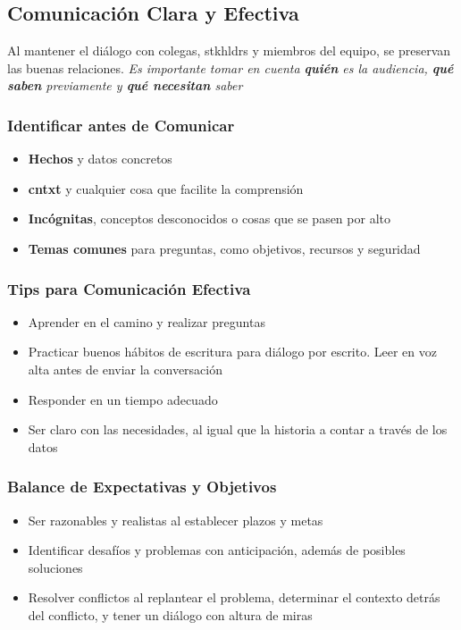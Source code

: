 \subsection{Comunicación Clara y Efectiva}
Al mantener el diálogo con colegas, \gls{stkhldrs} y miembros del equipo, se preservan las buenas relaciones. \textit{Es importante tomar en cuenta \textbf{quién} es la audiencia, \textbf{qué saben} previamente y \textbf{qué necesitan} saber}

\subsubsection{Identificar antes de Comunicar}
\begin{itemize}
    \item {\textbf{Hechos} y datos concretos}
    \item {\textbf{\gls{cntxt}} y cualquier cosa que facilite la comprensión}
    \item {\textbf{Incógnitas}, conceptos desconocidos o cosas que se pasen por alto}
    \item {\textbf{Temas comunes} para preguntas, como objetivos, recursos y seguridad}
\end{itemize}

\subsubsection{Tips para Comunicación Efectiva}
\begin{itemize}
    \item {Aprender en el camino y realizar preguntas}
    \item {Practicar buenos hábitos de escritura para diálogo por escrito. Leer en voz alta antes de enviar la conversación}
    \item {Responder en un tiempo adecuado}
    \item {Ser claro con las necesidades, al igual que la historia a contar a través de los datos}
\end{itemize}

\subsubsection{Balance de Expectativas y Objetivos}
\begin{itemize}
    \item {Ser razonables y realistas al establecer plazos y metas}
    \item {Identificar desafíos y problemas con anticipación, además de posibles soluciones}
    \item {Resolver conflictos al replantear el problema, determinar el contexto detrás del conflicto, y tener un diálogo con altura de miras}
\end{itemize}

